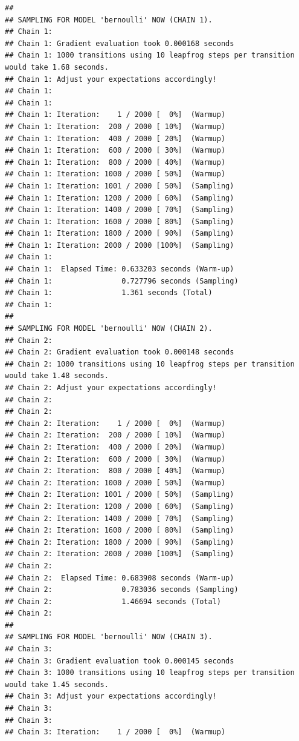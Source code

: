 \documentclass[
]{article}
\begin{document}
\begin{verbatim}
## 
## SAMPLING FOR MODEL 'bernoulli' NOW (CHAIN 1).
## Chain 1: 
## Chain 1: Gradient evaluation took 0.000168 seconds
## Chain 1: 1000 transitions using 10 leapfrog steps per transition would take 1.68 seconds.
## Chain 1: Adjust your expectations accordingly!
## Chain 1: 
## Chain 1: 
## Chain 1: Iteration:    1 / 2000 [  0%]  (Warmup)
## Chain 1: Iteration:  200 / 2000 [ 10%]  (Warmup)
## Chain 1: Iteration:  400 / 2000 [ 20%]  (Warmup)
## Chain 1: Iteration:  600 / 2000 [ 30%]  (Warmup)
## Chain 1: Iteration:  800 / 2000 [ 40%]  (Warmup)
## Chain 1: Iteration: 1000 / 2000 [ 50%]  (Warmup)
## Chain 1: Iteration: 1001 / 2000 [ 50%]  (Sampling)
## Chain 1: Iteration: 1200 / 2000 [ 60%]  (Sampling)
## Chain 1: Iteration: 1400 / 2000 [ 70%]  (Sampling)
## Chain 1: Iteration: 1600 / 2000 [ 80%]  (Sampling)
## Chain 1: Iteration: 1800 / 2000 [ 90%]  (Sampling)
## Chain 1: Iteration: 2000 / 2000 [100%]  (Sampling)
## Chain 1: 
## Chain 1:  Elapsed Time: 0.633203 seconds (Warm-up)
## Chain 1:                0.727796 seconds (Sampling)
## Chain 1:                1.361 seconds (Total)
## Chain 1: 
## 
## SAMPLING FOR MODEL 'bernoulli' NOW (CHAIN 2).
## Chain 2: 
## Chain 2: Gradient evaluation took 0.000148 seconds
## Chain 2: 1000 transitions using 10 leapfrog steps per transition would take 1.48 seconds.
## Chain 2: Adjust your expectations accordingly!
## Chain 2: 
## Chain 2: 
## Chain 2: Iteration:    1 / 2000 [  0%]  (Warmup)
## Chain 2: Iteration:  200 / 2000 [ 10%]  (Warmup)
## Chain 2: Iteration:  400 / 2000 [ 20%]  (Warmup)
## Chain 2: Iteration:  600 / 2000 [ 30%]  (Warmup)
## Chain 2: Iteration:  800 / 2000 [ 40%]  (Warmup)
## Chain 2: Iteration: 1000 / 2000 [ 50%]  (Warmup)
## Chain 2: Iteration: 1001 / 2000 [ 50%]  (Sampling)
## Chain 2: Iteration: 1200 / 2000 [ 60%]  (Sampling)
## Chain 2: Iteration: 1400 / 2000 [ 70%]  (Sampling)
## Chain 2: Iteration: 1600 / 2000 [ 80%]  (Sampling)
## Chain 2: Iteration: 1800 / 2000 [ 90%]  (Sampling)
## Chain 2: Iteration: 2000 / 2000 [100%]  (Sampling)
## Chain 2: 
## Chain 2:  Elapsed Time: 0.683908 seconds (Warm-up)
## Chain 2:                0.783036 seconds (Sampling)
## Chain 2:                1.46694 seconds (Total)
## Chain 2: 
## 
## SAMPLING FOR MODEL 'bernoulli' NOW (CHAIN 3).
## Chain 3: 
## Chain 3: Gradient evaluation took 0.000145 seconds
## Chain 3: 1000 transitions using 10 leapfrog steps per transition would take 1.45 seconds.
## Chain 3: Adjust your expectations accordingly!
## Chain 3: 
## Chain 3: 
## Chain 3: Iteration:    1 / 2000 [  0%]  (Warmup)

\end{verbatim}
\end{document}
